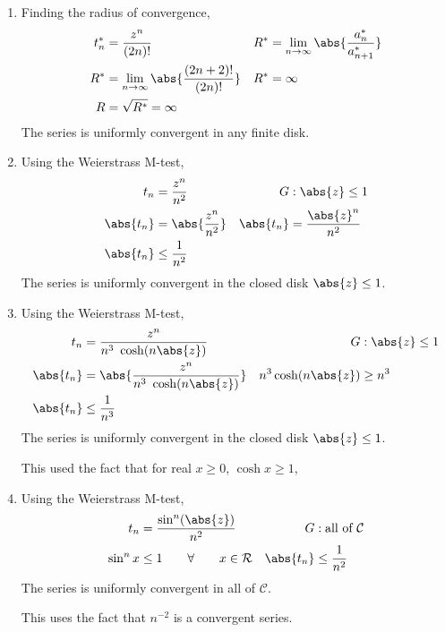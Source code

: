 \begin{enumerate}
    \item Finding the radius of convergence,
          \begin{align}
              t_n^* & = \frac{z^{n}}{(2n)!}                                 &
              R^*   & = \lim_{n \to \infty} \abs{\frac{a^*_{n}}{a^*_{n+1}}}   \\
              R^*   & = \lim_{n \to \infty} \abs{\frac{(2n+2)!}{(2n)!}}     &
              R^*   & = \infty                                                \\
              R     & = \sqrt{R^*} = \infty
          \end{align}
          The series \textcolor{y_h}{is uniformly convergent} in any finite disk.

    \item Using the Weierstrass M-test,
          \begin{align}
              t_n       & = \frac{z^{n}}{n^2}     &
              G         & : \abs{z}  \leq 1         \\
              \abs{t_n} & = \abs{\frac{z^n}{n^2}} &
              \abs{t_n} & = \frac{\abs{z}^n}{n^2}   \\
              \abs{t_n} & \leq \frac{1}{n^2}
          \end{align}
          The series \textcolor{y_h}{is uniformly convergent} in the closed disk
          $ \abs{z} \leq 1 $. \par

    \item Using the Weierstrass M-test,
          \begin{align}
              t_n                 & = \frac{z^{n}}{n^3\ \cosh(n\abs{z})}     &
              G                   & : \abs{z}  \leq 1                          \\
              \abs{t_n}           & = \abs{\frac{z^n}{n^3\ \cosh(n\abs{z})}} &
              n^3 \cosh(n\abs{z}) & \geq n^3                                   \\
              \abs{t_n}           & \leq \frac{1}{n^3}
          \end{align}
          The series \textcolor{y_h}{is uniformly convergent} in the closed disk
          $ \abs{z} \leq 1 $. \par
          This used the fact that for real $ x \geq 0 $, $ \cosh x \geq 1$,

    \item Using the Weierstrass M-test,
          \begin{align}
              t_n       & = \frac{\sin^n (\abs{z})}{n^2}                 &
              G         & : \text{all of}\ \mathcal{C}                     \\
              \sin^n x  & \leq 1 \qquad \forall \qquad x \in \mathcal{R} &
              \abs{t_n} & \leq \frac{1}{n^2}
          \end{align}
          The series \textcolor{y_h}{is uniformly convergent} in all of $ \mathcal{C} $.
          \par This uses the fact that $ n^{-2} $ is a convergent series.


\end{enumerate}
